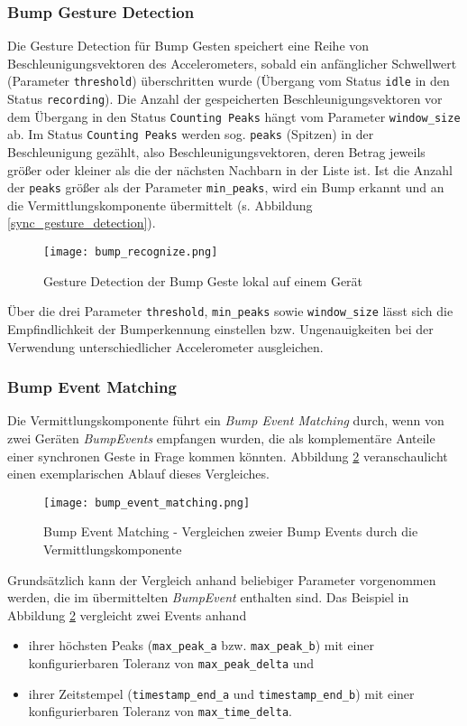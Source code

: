 {\subsubsection*{Bump Gesture Detection}
Die Gesture Detection für Bump Gesten speichert eine Reihe von Beschleunigungsvektoren des Accelerometers, sobald ein anfänglicher Schwellwert (Parameter \texttt{threshold}) überschritten wurde (Übergang vom Status \texttt{idle} in den Status \texttt{recording}). Die Anzahl der gespeicherten Beschleunigungsvektoren vor dem Übergang in den Status \texttt{Counting Peaks} hängt vom Parameter \texttt{win\-dow\_size} ab. Im Status \texttt{Counting Peaks} werden sog. \texttt{peaks} (Spitzen) in der Beschleunigung gezählt, also Beschleunigungsvektoren, deren Betrag jeweils größer oder kleiner als die der nächsten Nachbarn in der Liste ist. Ist die Anzahl der \texttt{peaks} größer als der Parameter \texttt{min\_peaks}, wird ein Bump erkannt und an die Vermittlungskomponente übermittelt (s. Abbildung \ref{sync_gesture_detection}).

\begin{figure}[H]
\texttt{[image: bump\_recognize.png]}
\caption{Gesture Detection der Bump Geste lokal auf einem Gerät}
\label{recognize_bump}
\end{figure}

Über die drei Parameter \texttt{threshold}, \texttt{min\_peaks} sowie \texttt{window\_size} lässt sich die Empfindlichkeit der Bumperkennung einstellen bzw. Ungenauigkeiten bei der Verwendung unterschiedlicher Accelerometer ausgleichen.

\subsubsection*{Bump Event Matching}
Die Vermittlungskomponente führt ein \textit{Bump Event Matching} durch, wenn von zwei Geräten \textit{BumpEvents} empfangen wurden, die als komplementäre Anteile einer synchronen Geste in Frage kommen könnten. Abbildung \ref{bump_event_matching} veranschaulicht einen exemplarischen Ablauf dieses Vergleiches.

\begin{figure}[H]
\texttt{[image: bump\_event\_matching.png]}
\caption{Bump Event Matching - Vergleichen zweier Bump Events durch die Vermittlungskomponente}
\label{bump_event_matching}
\end{figure}

Grundsätzlich kann der Vergleich anhand beliebiger Parameter vorgenommen werden, die im übermittelten \textit{BumpEvent} enthalten sind. Das Beispiel in Abbildung \ref{bump_event_matching} vergleicht zwei Events anhand 
\begin{itemize}
\item ihrer höchsten Peaks (\texttt{max\_peak\_a} bzw. \texttt{max\_peak\_b}) mit einer konfigurierbaren Toleranz von \texttt{max\_peak\_delta} und
\item ihrer Zeitstempel (\texttt{timestamp\_end\_a} und \texttt{timestamp\_end\_b}) mit einer  konfigurierbaren Toleranz von \texttt{max\_time\_delta}.
\end{itemize} 

}

